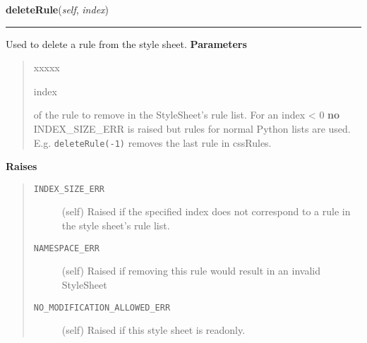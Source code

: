 \hspace{.8\funcindent}\begin{boxedminipage}{\funcwidth}

    \raggedright \textbf{deleteRule}(\textit{self}, \textit{index})

    \vspace{-1.5ex}

    \rule{\textwidth}{0.5\fboxrule}
\setlength{\parskip}{2ex}

Used to delete a rule from the style sheet.
\setlength{\parskip}{1ex}
      \textbf{Parameters}
      \vspace{-1ex}

      \begin{quote}
        \begin{Ventry}{xxxxx}

          \item[index]


of the rule to remove in the StyleSheet's rule list. For an
index {\textless} 0 \textbf{no} INDEX{\_}SIZE{\_}ERR is raised but rules for
normal Python lists are used. E.g. \texttt{deleteRule(-1)} removes
the last rule in cssRules.
        \end{Ventry}

      \end{quote}

      \textbf{Raises}
    \vspace{-1ex}

      \begin{quote}
        \begin{description}

          \item[\texttt{INDEX\_SIZE\_ERR}]


(self)
Raised if the specified index does not correspond to a rule in
the style sheet's rule list.
          \item[\texttt{NAMESPACE\_ERR}]


(self)
Raised if removing this rule would result in an invalid StyleSheet
          \item[\texttt{NO\_MODIFICATION\_ALLOWED\_ERR}]


(self)
Raised if this style sheet is readonly.
        \end{description}

      \end{quote}

    \end{boxedminipage}

